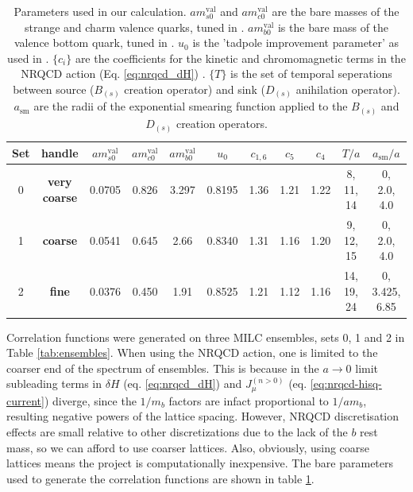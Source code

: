 \begin{table}[t!]
\hspace{-40pt}
 \begin{tabular}{c c c c c c c c c c c}
 \hline
 Set & handle & $am^{\text{val}}_{s0}$ & $am^{\text{val}}_{c0}$ & $am^{\text{val}}_{b0}$ & $u_0$ & $c_{1,6}$ & $c_5$ & $c_4$ & $T/a$ & $a_{\text{sm}}/a$ \\ [0.5ex] 
 \hline
 0 & {\textbf{very coarse}} & 0.0705 & 0.826 & 3.297 & 0.8195 & 1.36 & 1.21 & 1.22 & 8, 11, 14 & 0, 2.0, 4.0 \\ [1ex]
 1 & {\textbf{coarse}} & 0.0541 & 0.645 & 2.66 & 0.8340 & 1.31 & 1.16 & 1.20 & 9, 12, 15 & 0, 2.0, 4.0 \\ [1ex]
 2 & {\textbf{fine}} & 0.0376 & 0.450 & 1.91 & 0.8525 &  1.21 & 1.12 & 1.16 & 14, 19, 24 & 0, 3.425, 6.85 \\ [1ex]
 \hline
\end{tabular}
 \caption{Parameters used in our calculation. $am^{\text{val}}_{s0}$ and $am^{\text{val}}_{c0}$ are the bare masses of the strange and charm valence quarks, tuned in \cite{PhysRevD.91.054508}. $am^{\text{val}}_{b0}$ is the bare mass of the valence bottom quark, tuned in \cite{Dowdall:2011wh}. $u_0$ is the 'tadpole improvement parameter' as used in \cite{Dowdall:2011wh}. $\{c_i\}$ are the coefficients for the kinetic and chromomagnetic terms in the NRQCD action (Eq. \eqref{eq:nrqcd_dH}) \cite{Hammant:2013sca}. $\{T\}$ is the set of temporal seperations between source ($B_{(s)}$ creation operator) and sink ($D_{(s)}$ anihilation operator). $a_{\text{sm}}$ are the radii of the exponential smearing function applied to the $B_{(s)}$ and $D_{(s)}$ creation operators.
   \label{tab:quarkmasses}}
\end{table}

Correlation functions were generated on three MILC ensembles, sets 0, 1 and 2 in Table \ref{tab:ensembles}. When using the NRQCD action, one is limited to the coarser end of the spectrum of ensembles. This is because in the $a\to 0$ limit subleading terms in $\delta H$ (eq. \eqref{eq:nrqcd_dH}) and $J^{(n>0)}_{\mu}$ (eq. \eqref{eq:nrqcd-hisq-current}) diverge, since the $1/m_b$ factors are infact proportional to $1/am_b$, resulting negative powers of the lattice spacing. However, NRQCD discretisation effects are small relative to other discretizations due to the lack of the $b$ rest mass, so we can afford to use coarser lattices. Also, obviously, using coarse lattices means the project is computationally inexpensive. The bare parameters used to generate the correlation functions are shown in table \ref{tab:quarkmasses}.

